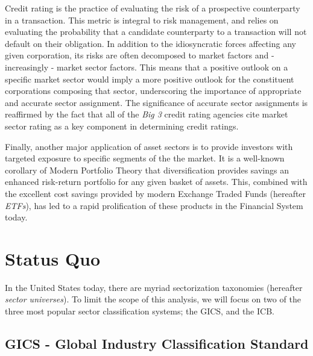 \documentclass[../main.tex]{subfiles}
\begin{document}
Credit rating is the practice of evaluating the risk of a prospective counterparty in a transaction. This metric is integral to risk management, and relies on evaluating the probability that a candidate counterparty to a transaction will not default on their obligation. In addition to the idiosyncratic forces affecting any given corporation, its risks are often decomposed to market factors and - increasingly - market sector factors. This means that a positive outlook on a specific market sector would imply a more positive outlook for the constituent corporations composing that sector, underscoring the importance of appropriate and accurate sector assignment. The significance of accurate sector assignments is reaffirmed by the fact that all of the \textit{Big 3} credit rating agencies cite market sector rating as a key component in determining credit ratings.

Finally, another major application of asset sectors is to provide investors with targeted exposure to specific segments of the the market. It is a well-known corollary of Modern Portfolio Theory that diversification provides savings an enhanced risk-return portfolio for any given basket of assets. This, combined with the excellent cost savings provided by modern Exchange Traded Funds (hereafter \textit{ETFs}), has led to a rapid prolification of these products in the Financial System today.

\section{Status Quo} \label{introduction:status_quo}

In the United States today, there are myriad sectorization taxonomies (hereafter \textit{sector universes}). To limit the scope of this analysis, we will focus on two of the three most popular sector classification systems; the GICS, and the ICB.

\subsection{GICS - Global Industry Classification Standard}
\end{document}
